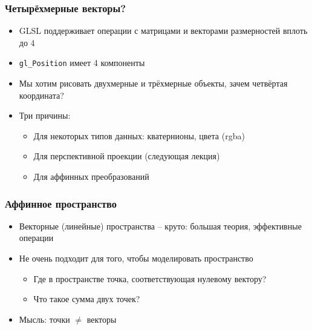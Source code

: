 \documentclass{beamer}
\begin{document}
\begin{frame}[fragile]
\frametitle{Четырёхмерные векторы?}
\begin{itemize}
\item GLSL поддерживает операции с матрицами и векторами размерностей вплоть до 4
\item \verb|gl_Position| имеет 4 компоненты
\pause
\item Мы хотим рисовать двухмерные и трёхмерные объекты, зачем четвёртая координата?
\pause
\item Три причины:
\pause
\begin{itemize}
\item Для некоторых типов данных: кватернионы, цвета (rgba)
\pause
\item Для перспективной проекции (следующая лекция)
\pause
\item Для аффинных преобразований
\end{itemize}
\end{itemize}
\end{frame}

\begin{frame}[fragile]
\frametitle{Аффинное пространство}
\begin{itemize}
\item Векторные (линейные) пространства -- круто: большая теория, эффективные операции
\pause
\item Не очень подходит для того, чтобы моделировать пространство
\pause
\begin{itemize}
\item Где в пространстве точка, соответствующая нулевому вектору?
\pause
\item Что такое сумма двух точек?
\end{itemize}
\pause
\item Мысль: точки \begin{math}\neq\end{math} векторы
\end{itemize}
\end{frame}
\end{document}
